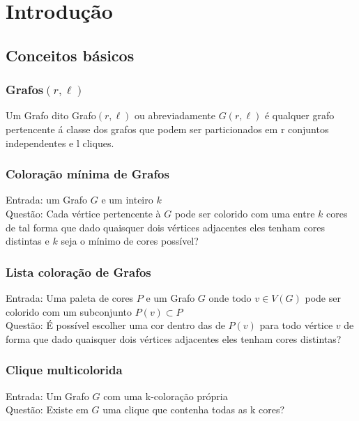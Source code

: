 \chapter{Introdução} \label{cap:intro}

\section{Conceitos básicos}

\subsection{Grafos$(r,\ell)$}
\begin{definition}
	Um Grafo dito Grafo$(r,\ell)$ ou abreviadamente $G(r,\ell)$ é qualquer grafo pertencente á classe dos grafos que podem ser particionados em r conjuntos independentes e l cliques.
\end{definition}

\subsection{Coloração mínima de Grafos}
\begin{definition}
	Entrada: um Grafo $G$ e um inteiro $k$\\
	Questão: Cada vértice pertencente à $G$ pode ser colorido com uma entre $k$ cores
	de tal forma que dado quaisquer dois vértices adjacentes eles tenham cores distintas e $k$ seja o mínimo de cores possível?
\end{definition}

\subsection{Lista coloração de Grafos}
\begin{definition}
  Entrada: Uma paleta de cores $P$ e um Grafo $G$ onde todo $v \in V(G)$ pode ser colorido com um subconjunto $P(v) \subset P$\\
  Questão: É possível escolher uma cor dentro das de $P(v)$ para todo vértice $v$ de forma que dado quaisquer dois vértices adjacentes eles tenham cores distintas?
\end{definition}

\subsection{Clique multicolorida}
\begin{definition}
 Entrada: Um Grafo $G$ com uma k-coloração própria\\
 Questão: Existe em $G$ uma clique que contenha todas as k cores?
\end{definition}

